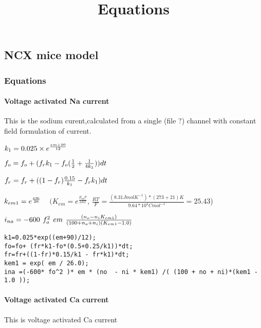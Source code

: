 \documentclass[11pt]{article}
\title{Equations}
\begin{document}
    
    
    \maketitle
    
    

    
    \subsection{NCX mice model}\label{ncx-mice-model}

    \subsubsection{Equations}\label{equations}

    \paragraph{Voltage activated Na
current}\label{voltage-activated-na-current}

This is the sodium curent,calculated from a single (file ?) channel with
constant field formulation of current.

    \(\large{k_1 = 0.025 \times e^{\frac{em+90}{12}}}\)

\(\large{f_o = f_o + (f_rk_1 - f_o(\frac{1}{2} + \frac{1}{4k_1}))dt}\)

\(\large{f_r = f_r + ((1-f_r)\frac{0.15}{k_1} - f_rk_1)dt}\)

\(\large{k_{em1} = e^{\frac{em}{26}}}\)\(~~~~~(K_{em} = e^{\frac{E_{m}F}{2RT}}\),
\(\frac{RT}{F} = \frac{(8.31 J mol K^{-1}) * (273+21)K}{9.64*10^{4}C mol^{-1}} = 25.43\))

\(\large{ i_{na} = -600~f_o^{2}~em~\frac{(n_o -n_iK_{em1})}{(100 + n_o + n_i)(K_{em1} -1.0)} }\)

    \begin{verbatim}
k1=0.025*exp((em+90)/12);
fo=fo+ (fr*k1-fo*(0.5+0.25/k1))*dt;
fr=fr+((1-fr)*0.15/k1 - fr*k1)*dt;
kem1 = exp( em / 26.0);
ina =(-600* fo^2 )* em * (no  - ni * kem1) /( (100 + no + ni)*(kem1 - 1.0 ));
\end{verbatim}

    \paragraph{Voltage activated Ca
current}\label{voltage-activated-ca-current}

This is voltage activated Ca current
\end{document}
